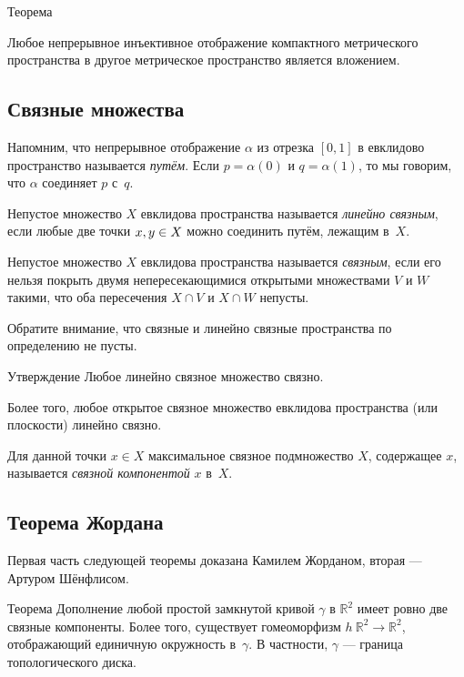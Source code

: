 \begin{multicols}{2}
{\begin{thm}{Теорема}
{\sloppy

\begin{subthm}{}
Любое непрерывное инъективное отображение компактного метрического пространства в другое метрическое пространство
является вложением.
\end{subthm}

}

\end{thm}

\subsection*{Связные множества}

Напомним, что непрерывное отображение $\alpha$ из отрезка $[0,1]$ в евклидово пространство называется \emph{путём}.
Если $p=\alpha (0)$ и $q = \alpha (1)$, то мы говорим, что $\alpha$ соединяет $p$ с~$q$.

Непустое множество $X$ евклидова пространства называется \emph{линейно связным}, если любые две точки $x,y\z\in X$ можно соединить путём, лежащим в~$X$.

Непустое множество $X$ евклидова пространства называется \emph{связным}, если его нельзя покрыть двумя непересекающимися открытыми множествами $V$ и $W$ такими, что оба пересечения $X\cap V$ и $X\cap W$ непусты.

Обратите внимание, что связные и линейно связные пространства по определению не пусты. 

\begin{thm}{Утверждение}
Любое линейно связное множество связно.

Более того, любое открытое связное множество евклидова пространства (или плоскости) линейно связно.
\end{thm}

Для данной точки $x\in X$ максимальное связное подмножество $X$, содержащее $x$, называется {}\emph{связной компонентой} $x$ в~$X$.

\subsection*{Теорема Жордана}

Первая часть следующей теоремы доказана Камилем Жорданом, вторая --- Артуром Шёнфлисом.

\begin{thm}{Теорема}\label{thm:jordan}
Дополнение любой простой замкнутой кривой $\gamma$ в $\mathbb{R}^2$ имеет ровно две связные компоненты. 
Более того, существует гомеоморфизм $h\:\mathbb{R}^2\to \mathbb{R}^2$, отображающий единичную окружность в~$\gamma$.
В частности, $\gamma$ --- граница топологического диска.
\end{thm}


}
\end{multicols}
